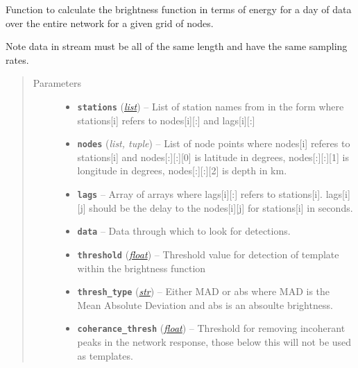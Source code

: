 \documentclass[a4paper,10pt,english]{sphinxmanual}
\begin{document}

\begin{fulllineitems}
\label{modules:bright_lights.brightness}
Function to calculate the brightness function in terms of energy for a day
of data over the entire network for a given grid of nodes.

Note data in stream must be all of the same length and have the same
sampling rates.
\begin{quote}\begin{description}
\item[{Parameters}] \leavevmode\begin{itemize}
\item {} 
\textbf{\texttt{stations}} (\href{https://docs.python.org/library/functions.html\#list}{\emph{list}}) -- List of station names from in the form where stations{[}i{]}    refers to nodes{[}i{]}{[}:{]} and lags{[}i{]}{[}:{]}

\item {} 
\textbf{\texttt{nodes}} (\emph{list, tuple}) -- List of node points where nodes{[}i{]} referes to stations{[}i{]} and    nodes{[}:{]}{[}:{]}{[}0{]} is latitude in degrees, nodes{[}:{]}{[}:{]}{[}1{]} is longitude in    degrees, nodes{[}:{]}{[}:{]}{[}2{]} is depth in km.

\item {} 
\textbf{\texttt{lags}} -- Array of arrays where lags{[}i{]}{[}:{]} refers to stations{[}i{]}.    lags{[}i{]}{[}j{]} should be the delay to the nodes{[}i{]}{[}j{]} for stations{[}i{]} in seconds.

\item {} 
\textbf{\texttt{data}} -- Data through which to look for detections.

\item {} 
\textbf{\texttt{threshold}} (\href{https://docs.python.org/library/functions.html\#float}{\emph{float}}) -- Threshold value for detection of template within the    brightness function

\item {} 
\textbf{\texttt{thresh\_type}} (\href{https://docs.python.org/library/functions.html\#str}{\emph{str}}) -- Either MAD or abs where MAD is the Mean Absolute    Deviation and abs is an absoulte brightness.

\item {} 
\textbf{\texttt{coherance\_thresh}} (\href{https://docs.python.org/library/functions.html\#float}{\emph{float}}) -- Threshold for removing incoherant peaks in the            network response, those below this will not be used as templates.


\end{itemize}
\end{description}
\end{quote}
\end{fulllineitems}
\end{document}
